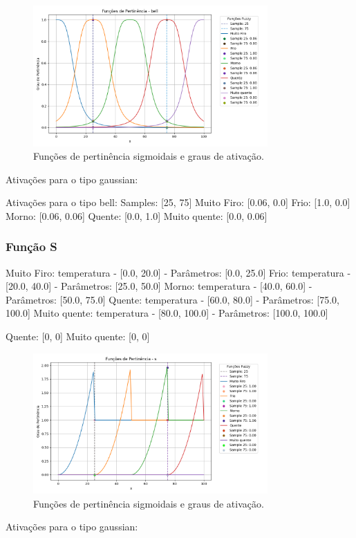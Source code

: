 \documentclass[a4paper,12pt]{article}
\begin{document}
\begin{figure}[H]
    \centering
    \includegraphics[width=0.8\textwidth]{img/funções_de_pertinência_bell_fuzzificado.png}
    \caption{Funções de pertinência sigmoidais e graus de ativação.}
\end{figure}
Ativações para o tipo gaussian:

Ativações para o tipo bell:
Samples: [25, 75]
Muito Firo: [0.06, 0.0]
Frio: [1.0, 0.0]
Morno: [0.06, 0.06]
Quente: [0.0, 1.0]
Muito quente: [0.0, 0.06]


\subsubsection{Função S}

Muito Firo: temperatura - [0.0, 20.0] - Parâmetros: [0.0, 25.0]
Frio: temperatura - [20.0, 40.0] - Parâmetros: [25.0, 50.0]
Morno: temperatura - [40.0, 60.0] - Parâmetros: [50.0, 75.0]
Quente: temperatura - [60.0, 80.0] - Parâmetros: [75.0, 100.0]
Muito quente: temperatura - [80.0, 100.0] - Parâmetros: [100.0, 100.0]


Quente: [0, 0]
Muito quente: [0, 0]

\begin{figure}[H]
    \centering
    \includegraphics[width=0.8\textwidth]{img/funções_de_pertinência_s_fuzzificado.png}
    \caption{Funções de pertinência sigmoidais e graus de ativação.}
\end{figure}
Ativações para o tipo gaussian:
\end{document}
